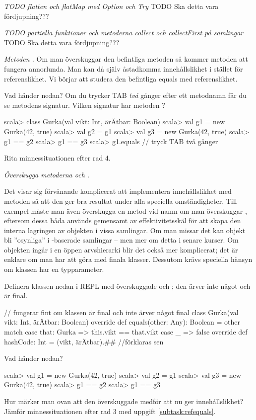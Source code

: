 \Task \emph{TODO flatten och flatMap med Option och Try} TODO Ska detta vara fördjupning???


\Task \emph{TODO partiella funktioner och metoderna collect och collectFirst på samlingar} TODO Ska detta vara fördjupning???


\Task \emph{Metoden .}  Om man överskuggar den befintliga metoden  så kommer metoden \code{==} att fungera annorlunda. Man kan då själv åstadkomma innehållslikhet i stället för referenslikhet. Vi börjar att studera den befintliga equals med referenslikhet.

\Subtask \label{subtask:refequals} Vad händer nedan? Om du trycker TAB \emph{två} gånger efter ett metodnamn får du se metodens signatur. Vilken signatur har metoden ?
\begin{REPL}
scala> class Gurka(val vikt: Int, ärÄtbar: Boolean)
scala> val g1 = new Gurka(42, true)
scala> val g2 = g1
scala> val g3 = new Gurka(42, true)
scala> g1 == g2
scala> g1 == g3
scala> g1.equals  // tryck TAB två gånger
\end{REPL}

\Subtask\Pen Rita minnessituationen efter rad 4.

\Subtask \emph{Överskugga metoderna  och .} 

\begin{Background}
Det visar sig förvånande komplicerat att implementera innehållslikhet med metoden  så att den ger bra resultat under alla speciella omständigheter. Till exempel måste man även överskugga en metod vid namn  om man överskuggar , eftersom dessa båda används gemensamt av effektivitetsskäl för att skapa den interna lagringen av objekten i vissa samlingar. Om man missar det kan objekt bli ''osynliga'' i -baserade samlingar -- men mer om detta i senare kurser. Om objekten ingår i en öppen arvshierarki blir det också mer komplicerat; det är enklare om man har att göra med finala klasser. Dessutom krävs speciella hänsyn om klassen har en typparameter.
\end{Background}

\noindent Definera klassen nedan i REPL med överskuggade  och ; den ärver inte något och är final.

\begin{Code}
// fungerar fint om klassen är final och inte ärver något
final class Gurka(val vikt: Int, ärÄtbar: Boolean) { 
  override def equals(other: Any): Boolean = other match {
    case that: Gurka => this.vikt == that.vikt
    case _ => false     
  }
  override def hashCode: Int = (vikt, ärÄtbar).## //förklaras sen
}
\end{Code}
\Subtask Vad händer nedan?
\begin{REPL}
scala> val g1 = new Gurka(42, true)
scala> val g2 = g1
scala> val g3 = new Gurka(42, true)
scala> g1 == g2
scala> g1 == g3
\end{REPL}
\Subtask\Pen Hur märker man ovan att den överskuggade  medför att \code{==} nu ger innehållslikhet? Jämför minnessituationen efter rad 3 med uppgift \ref{subtask:refequals}. 


